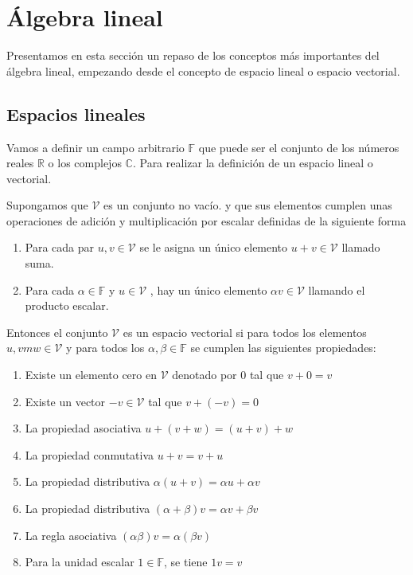 \section{Álgebra lineal}

Presentamos en esta sección un repaso de los conceptos más importantes del álgebra lineal, empezando desde el concepto de espacio lineal o espacio vectorial.

\subsection{Espacios lineales}

Vamos a definir un campo arbitrario $\mathbb{F} $ que puede ser el conjunto de los números reales $\mathbb{R}$ o los complejos $\mathbb{C}$.  Para realizar la definición de un espacio lineal o vectorial.

Supongamos que $\mathcal{V}$ es un conjunto no vacío. y que sus elementos cumplen unas operaciones de adición y multiplicación por escalar definidas de la siguiente forma

\begin{enumerate}[label=\alph*.]
    \item Para cada par $u,v \in \mathcal{V} $  se le asigna un único elemento $u+v \in \mathcal{V}$  llamado suma.
    \item Para cada $\alpha \in \mathbb{F}$ y  $u \in \mathcal{V} $ , hay un único elemento $\alpha v \in \mathcal{V}$ llamando el producto escalar. 
\end{enumerate}

Entonces el conjunto $\mathcal{V}$ es un espacio vectorial si para todos los elementos $u,vm w \in \mathcal{V}$ y para todos los $\alpha,\beta \in \mathbb{F}$ se cumplen las siguientes propiedades:

\begin{enumerate}[label=\roman*.]
    \item Existe un elemento cero en $\mathcal{V}$ denotado por $0$ tal que $v+0 = v$
    \item Existe un vector $-v \in \mathcal{V}$ tal que $v+(-v)=0$
    \item La propiedad asociativa $u+(v+w)=(u+v)+w$
    \item La propiedad conmutativa $u+v=v+u$
    \item La propiedad distributiva $\alpha(u+v) = \alpha u + \alpha v$
    \item La propiedad distributiva $(\alpha + \beta )v = \alpha v + \beta v$
    \item La regla asociativa $(\alpha \beta ) v = \alpha (\beta v)$
    \item Para la unidad escalar $1 \in \mathbb{F}$,  se tiene $1 v = v$
\end{enumerate}

